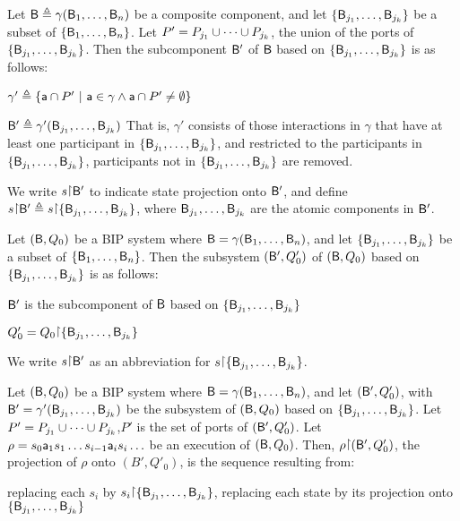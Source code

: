 \bd[Subcomponent]\label{def.bip.subcomponent}
Let $\mathsf{B} \triangleq \gamma(\mathsf{B}_1,\dots,\mathsf{B}_n)$ be a composite component, and let 
$\{ \mathsf{B}_{j_1},\dots,\mathsf{B}_{j_k} \}$ be a subset of $\{ \mathsf{B}_{1},\dots,\mathsf{B}_{n} \}$.
Let $P' = P_{j_1} \cup \cdots \cup P_{j_k}$, \ie the union of the ports of $\{ \mathsf{B}_{j_1},\dots,\mathsf{B}_{j_k} \}$.
Then the subcomponent $\mathsf{B}'$ of $\mathsf{B}$ based on $\{ \mathsf{B}_{j_1},\dots,\mathsf{B}_{j_k} \}$ 
is as follows:
\bn
\item $\gamma' \triangleq \{  \mathsf{a} \cap P' ~|~ \mathsf{a} \in \gamma \land \mathsf{a} \cap P' \ne \emptyset \}$
\item $\mathsf{B}' \triangleq \gamma'(\mathsf{B}_{j_1},\dots,\mathsf{B}_{j_k})$ 
\en
\ed
That is, $\gamma'$ consists of those interactions in $\gamma$ that have at least one participant in 
$\{ \mathsf{B}_{j_1},\dots,\mathsf{B}_{j_k} \}$, and restricted to the participants in $\{ \mathsf{B}_{j_1},\dots,\mathsf{B}_{j_k} \}$,
\ie participants not in $\{ \mathsf{B}_{j_1},\dots,\mathsf{B}_{j_k} \}$ are removed.

We write $s \pj \B'$ to indicate state projection onto $\mathsf{B}'$, and define 
$s \pj \B' \df  s \pj \set{\B_{j_1}, \dots, \B_{j_k}}$, where $\mathsf{B}_{j_1},\dots,\mathsf{B}_{j_k}$ are the atomic
components in $\mathsf{B}'$.






\bd[Subsystem]\label{def.bip.subsystem}
Let $(\mathsf{B}, Q_0)$ be a BIP system where $\mathsf{B} = \gamma(\mathsf{B}_1,\dots,\mathsf{B}_n)$, and let 
$\{ \mathsf{B}_{j_1},\dots,\mathsf{B}_{j_k} \}$ be a subset of $\{ \mathsf{B}_{1},\dots,\mathsf{B}_{n} \}$.
Then the subsystem $(\mathsf{B}', Q'_0)$ of  $(\mathsf{B}, Q_0)$ based on $\{ \mathsf{B}_{j_1},\dots,\mathsf{B}_{j_k} \}$ 
is as follows:
\bn
\item $\mathsf{B}'$ is the subcomponent of $\mathsf{B}$ based on $\{ \mathsf{B}_{j_1},\dots,\mathsf{B}_{j_k} \}$ 
\item $Q'_0 = Q_0 \pj \set{\B_{j_1},\dots,\B_{j_k}}$
\en
\ed

We write $s \pj \B'$ as an abbreviation for $s \pj \set{\B_{j_1},\dots,\B_{j_k}}$.



\label{def.bip.execution.projection}
Let $(\mathsf{B}, Q_0)$ be a BIP system where $\mathsf{B} = \gamma(\mathsf{B}_1,\dots,\mathsf{B}_n)$, and let $(\mathsf{B}', Q'_0)$, with $\mathsf{B}'
= \gamma'(\mathsf{B}_{j_1},\dots,\mathsf{B}_{j_k})$ be the subsystem of $(\mathsf{B}, Q_0)$ based on $\{ \mathsf{B}_{j_1},\dots,\mathsf{B}_{j_k} \}$.
Let $P' = P_{j_1} \cup \cdots \cup P_{j_k}$,\ie $P'$ is the set of ports of $(\mathsf{B}', Q'_0)$.
%
Let $\rho = s_0 \mathsf{a}_1 s_1 \ldots s_{i-1} \mathsf{a}_i s_i \ldots$ be an execution of $(\mathsf{B}, Q_0)$.  Then, $\rho \pj (\B', Q'_0)$, the projection
of $\rho$ onto $(B', Q'_0)$, is the sequence resulting from:
\bn
\item \label{def.clause.bip.execution.projection.state} 
replacing each $s_i$ by $s_i \pj \set{\B_{j_1},\dots,\B_{j_k}}$, \ie replacing each state by its
projection onto $\{ \mathsf{B}_{j_1},\dots,\mathsf{B}_{j_k} \}$

